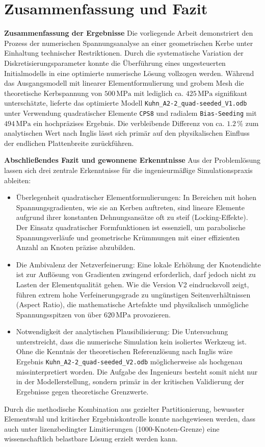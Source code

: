 \chapter{Zusammenfassung und Fazit}
\label{sec:Zusammenfassung und Fazit}

\textbf{Zusammenfassung der Ergebnisse} \newline
Die vorliegende Arbeit demonstriert den Prozess der numerischen Spannungsanalyse an einer geometrischen Kerbe unter Einhaltung technischer Restriktionen. Durch die systematische Variation der Diskretisierungsparameter konnte die Überführung eines ungesteuerten Initialmodells in eine optimierte numerische Lösung vollzogen werden. Während das Ausgangsmodell mit linearer Elementformulierung und grobem Mesh die theoretische Kerbspannung von ${500\,\mathrm{MPa}}$ mit lediglich ca. ${425\,\mathrm{MPa}}$ signifikant unterschätzte, lieferte das optimierte Modell \texttt{Kuhn\_A2-2\_quad-seeded\_V1.odb} unter Verwendung quadratischer Elemente \texttt{CPS8} und radialem \texttt{Bias-Seeding} mit ${494\,\mathrm{MPa}}$ ein hochpräzises Ergebnis. Die verbleibende Differenz von ca. ${1.2\,\%}$ zum analytischen Wert nach Inglis lässt sich primär auf den physikalischen Einfluss der endlichen Plattenbreite zurückführen.

\textbf{Abschließendes Fazit und gewonnene Erkenntnisse} \newline
Aus der Problemlösung lassen sich drei zentrale Erkenntnisse für die ingenieurmäßige Simulationspraxis ableiten:
\begin{itemize}
    \item Überlegenheit quadratischer Elementformulierungen: In Bereichen mit hohen Spannungsgradienten, wie sie an Kerben auftreten, sind lineare Elemente aufgrund ihrer konstanten Dehnungsansätze oft zu steif (Locking-Effekte). Der Einsatz quadratischer Formfunktionen ist essenziell, um parabolische Spannungsverläufe und geometrische Krümmungen mit einer effizienten Anzahl an Knoten präzise abzubilden.
    \item Die Ambivalenz der Netzverfeinerung: Eine lokale Erhöhung der Knotendichte ist zur Auflösung von Gradienten zwingend erforderlich, darf jedoch nicht zu Lasten der Elementqualität gehen. Wie die Version V2 eindrucksvoll zeigt, führen extrem hohe Verfeinerungsgrade zu ungünstigen Seitenverhältnissen (Aspect Ratio), die mathematische Artefakte und physikalisch unmögliche Spannungsspitzen von über ${620\,\mathrm{MPa}}$ provozieren.
    \item Notwendigkeit der analytischen Plausibilisierung: Die Untersuchung unterstreicht, dass die numerische Simulation kein isoliertes Werkzeug ist. Ohne die Kenntnis der theoretischen Referenzlösung nach Inglis wäre Ergebnis \texttt{Kuhn\_A2-2\_quad-seeded\_V2.odb} möglicherweise als hochgenau missinterpretiert worden. Die Aufgabe des Ingenieurs besteht somit nicht nur in der Modellerstellung, sondern primär in der kritischen Validierung der Ergebnisse gegen theoretische Grenzwerte.
\end{itemize}
Durch die methodische Kombination aus gezielter Partitionierung, bewusster Elementwahl und kritischer Ergebniskontrolle konnte nachgewiesen werden, dass auch unter lizenzbedingter Limitierungen (1000-Knoten-Grenze) eine wissenschaftlich belastbare Lösung erzielt werden kann.